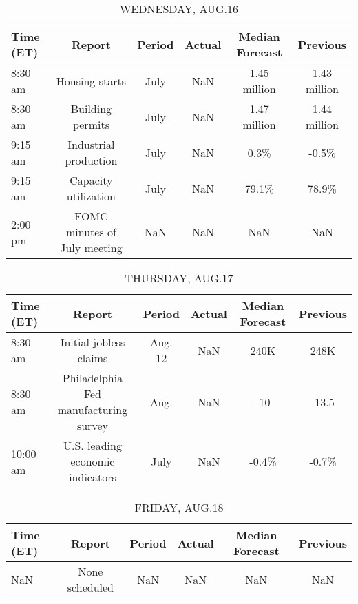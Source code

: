 \documentclass{article}%
\begin{document}
\begin{table}[htbp]%
\caption{WEDNESDAY, AUG.16}%
\centering%
\begin{adjustbox}{width=1\textwidth}%
\begin{tabular}{lccccc}
\toprule
Time (ET) &                       Report & Period & Actual & Median Forecast &     Previous \\
\midrule
  8:30 am &               Housing starts &   July &    NaN &    1.45 million & 1.43 million \\
  8:30 am &             Building permits &   July &    NaN &    1.47 million & 1.44 million \\
  9:15 am &        Industrial production &   July &    NaN &            0.3\% &        -0.5\% \\
  9:15 am &         Capacity utilization &   July &    NaN &           79.1\% &        78.9\% \\
  2:00 pm & FOMC minutes of July meeting &    NaN &    NaN &             NaN &          NaN \\
\bottomrule
\end{tabular}
%
\end{adjustbox}%
\end{table}

%


\begin{table}[htbp]%
\caption{THURSDAY, AUG.17}%
\centering%
\begin{adjustbox}{width=1\textwidth}%
\begin{tabular}{lccccc}
\toprule
Time (ET) &                                Report &  Period & Actual & Median Forecast & Previous \\
\midrule
  8:30 am &                Initial jobless claims & Aug. 12 &    NaN &            240K &     248K \\
  8:30 am & Philadelphia Fed manufacturing survey &    Aug. &    NaN &             -10 &    -13.5 \\
 10:00 am &      U.S. leading economic indicators &    July &    NaN &           -0.4\% &    -0.7\% \\
\bottomrule
\end{tabular}
%
\end{adjustbox}%
\end{table}

%


\begin{table}[htbp]%
\caption{FRIDAY, AUG.18}%
\centering%
\begin{adjustbox}{width=1\textwidth}%
\begin{tabular}{lccccc}
\toprule
Time (ET) &         Report & Period & Actual & Median Forecast & Previous \\
\midrule
      NaN & None scheduled &    NaN &    NaN &             NaN &      NaN \\
\bottomrule
\end{tabular}
%
\end{adjustbox}%
\end{table}
\end{document}
